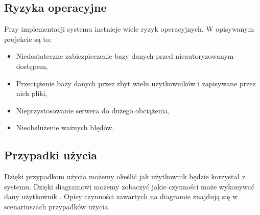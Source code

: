 \subsection{Ryzyka operacyjne}
Przy implementacji systemu instnieje wiele ryzyk operacyjnych. W opisywanym projekcie są to:
\begin{itemize}
	\item Niedostateczne zabiezpieczenie bazy danych przed nieautoryzowanym dostępem,
	\item Przeciążenie bazy danych przez zbyt wielu użytkowników i zapisywane przez nich pliki,
	\item Nieprzystosowanie serwera do dużego obciążenia,
	\item Nieobsłużenie ważnych błędów.
\end{itemize}
\subsection{Przypadki użycia}
Dzięki przypadkom użycia możemy okeślić jak użytkownik będzie korzystał z systemu. Dzięki diagramowi możemy zobaczyć jakie czynności może wykonywać dany użytkownik \cite{DOC03}. Opisy czynności zawartych na diagramie znajdują się w scenariuszach przypadków użycia.

